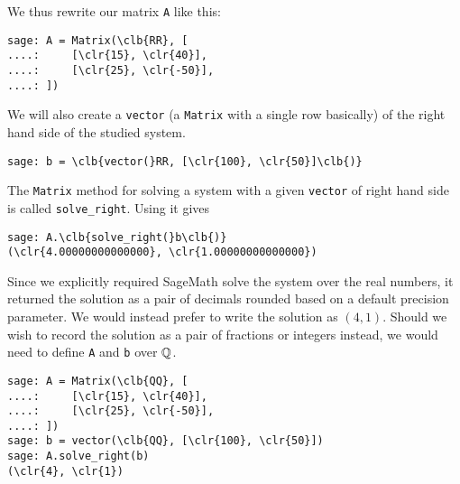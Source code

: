 We thus rewrite our matrix \texttt{A} like this:
\begin{Verbatim}
sage: A = Matrix(\clb{RR}, [
....:     [\clr{15}, \clr{40}],
....:     [\clr{25}, \clr{-50}],
....: ])
\end{Verbatim}
We will also create a \texttt{vector} (a \texttt{Matrix} with a single row
basically) of the right hand side of the studied system.
\begin{Verbatim}
sage: b = \clb{vector(}RR, [\clr{100}, \clr{50}]\clb{)}
\end{Verbatim}
The \texttt{Matrix} method for solving a system with a given \texttt{vector} of
right hand side is called \texttt{solve\_right}. Using it gives
\begin{Verbatim}
sage: A.\clb{solve_right(}b\clb{)}
(\clr{4.00000000000000}, \clr{1.00000000000000})
\end{Verbatim}
Since we explicitly required SageMath solve the system over the real numbers, it
returned the solution as a pair of decimals rounded based on a default precision
parameter. We would instead prefer to write the solution as $(4,1)$. Should we
wish to record the solution as a pair of fractions or integers instead, we would
need to define \texttt{A} and \texttt{b} over $\mathbb{Q}$.
\begin{Verbatim}
sage: A = Matrix(\clb{QQ}, [
....:     [\clr{15}, \clr{40}],
....:     [\clr{25}, \clr{-50}],
....: ])
sage: b = vector(\clb{QQ}, [\clr{100}, \clr{50}])
sage: A.solve_right(b)
(\clr{4}, \clr{1})
\end{Verbatim}






